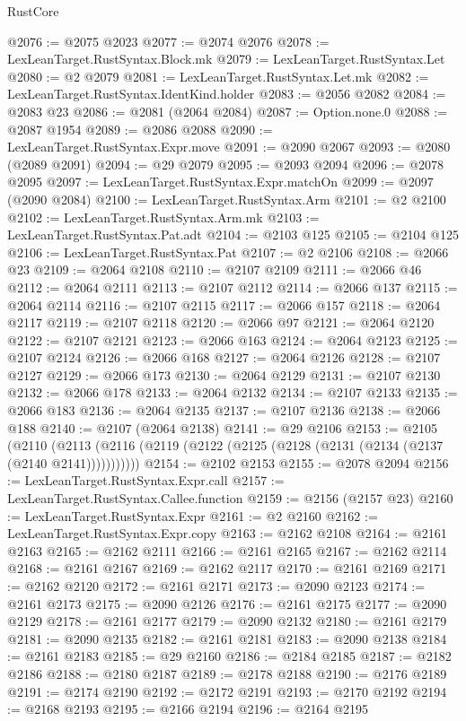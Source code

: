 \begin{lexlean}{RustCore}
\begin{coremodule}
@2076 := @2075 @2023
@2077 := @2074 @2076
@2078 := LexLeanTarget.RustSyntax.Block.mk
@2079 := LexLeanTarget.RustSyntax.Let
@2080 := @2 @2079
@2081 := LexLeanTarget.RustSyntax.Let.mk
@2082 := LexLeanTarget.RustSyntax.IdentKind.holder
@2083 := @2056 @2082
@2084 := @2083 @23
@2086 := @2081 (@2064 @2084)
@2087 := Option.none.{0}
@2088 := @2087 @1954
@2089 := @2086 @2088
@2090 := LexLeanTarget.RustSyntax.Expr.move
@2091 := @2090 @2067
@2093 := @2080 (@2089 @2091)
@2094 := @29 @2079
@2095 := @2093 @2094
@2096 := @2078 @2095
@2097 := LexLeanTarget.RustSyntax.Expr.matchOn
@2099 := @2097 (@2090 @2084)
@2100 := LexLeanTarget.RustSyntax.Arm
@2101 := @2 @2100
@2102 := LexLeanTarget.RustSyntax.Arm.mk
@2103 := LexLeanTarget.RustSyntax.Pat.adt
@2104 := @2103 @125
@2105 := @2104 @125
@2106 := LexLeanTarget.RustSyntax.Pat
@2107 := @2 @2106
@2108 := @2066 @23
@2109 := @2064 @2108
@2110 := @2107 @2109
@2111 := @2066 @46
@2112 := @2064 @2111
@2113 := @2107 @2112
@2114 := @2066 @137
@2115 := @2064 @2114
@2116 := @2107 @2115
@2117 := @2066 @157
@2118 := @2064 @2117
@2119 := @2107 @2118
@2120 := @2066 @97
@2121 := @2064 @2120
@2122 := @2107 @2121
@2123 := @2066 @163
@2124 := @2064 @2123
@2125 := @2107 @2124
@2126 := @2066 @168
@2127 := @2064 @2126
@2128 := @2107 @2127
@2129 := @2066 @173
@2130 := @2064 @2129
@2131 := @2107 @2130
@2132 := @2066 @178
@2133 := @2064 @2132
@2134 := @2107 @2133
@2135 := @2066 @183
@2136 := @2064 @2135
@2137 := @2107 @2136
@2138 := @2066 @188
@2140 := @2107 (@2064 @2138)
@2141 := @29 @2106
@2153 := @2105
    (@2110 (@2113 (@2116 (@2119 (@2122 (@2125 (@2128 (@2131 (@2134 (@2137 (@2140 @2141)))))))))))
@2154 := @2102 @2153
@2155 := @2078 @2094
@2156 := LexLeanTarget.RustSyntax.Expr.call
@2157 := LexLeanTarget.RustSyntax.Callee.function
@2159 := @2156 (@2157 @23)
@2160 := LexLeanTarget.RustSyntax.Expr
@2161 := @2 @2160
@2162 := LexLeanTarget.RustSyntax.Expr.copy
@2163 := @2162 @2108
@2164 := @2161 @2163
@2165 := @2162 @2111
@2166 := @2161 @2165
@2167 := @2162 @2114
@2168 := @2161 @2167
@2169 := @2162 @2117
@2170 := @2161 @2169
@2171 := @2162 @2120
@2172 := @2161 @2171
@2173 := @2090 @2123
@2174 := @2161 @2173
@2175 := @2090 @2126
@2176 := @2161 @2175
@2177 := @2090 @2129
@2178 := @2161 @2177
@2179 := @2090 @2132
@2180 := @2161 @2179
@2181 := @2090 @2135
@2182 := @2161 @2181
@2183 := @2090 @2138
@2184 := @2161 @2183
@2185 := @29 @2160
@2186 := @2184 @2185
@2187 := @2182 @2186
@2188 := @2180 @2187
@2189 := @2178 @2188
@2190 := @2176 @2189
@2191 := @2174 @2190
@2192 := @2172 @2191
@2193 := @2170 @2192
@2194 := @2168 @2193
@2195 := @2166 @2194
@2196 := @2164 @2195

\end{coremodule}
\end{lexlean}
